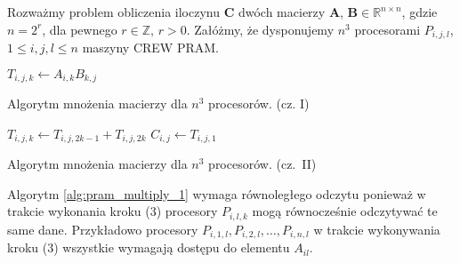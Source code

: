 
Rozważmy problem obliczenia iloczynu \(\mathbf{C}\) dwóch macierzy \(\mathbf{A}\), \(\mathbf{B}\in\mathbb{R}^{n\times n}\), gdzie \(n=2^r\), dla pewnego \(r\in\mathbb{Z},\, r>0\). Załóżmy, że dysponujemy \(n^3\) procesorami \(P_{i,j,l}\), \(1\leq i, j, l \leq n\) maszyny CREW PRAM. 

\begin{algorithm}[h]
\centering
\begin{algorithmic}[1]
\State \(T_{i,j,k} \gets A_{i,k}B_{k,j}\)
\EndParFor
{} 
\end{algorithmic}
\caption{Algorytm mnożenia macierzy dla \(n^3\) procesorów.\cite{Czech} (cz. I)}
\label{alg:pram_multiply_1}
\end{algorithm}

\begin{algorithm}[h]
\ContinuedFloat
\centering
\begin{algorithmic}[1]
	\State \(T_{i,j,k} \gets T_{i,j,2k-1}+T_{i,j,2k}\)
\EndParFor
\EndFor
{}
\State \(C_{i,j} \gets T_{i,j,1} \)
\EndParFor
\end{algorithmic}
\caption{Algorytm mnożenia macierzy dla \(n^3\) procesorów.\cite{Czech} (cz. II)}
\label{alg:pram_multiply_1}
\end{algorithm}

\begin{uwaga}
Algorytm \ref{alg:pram_multiply_1} wymaga równoległego odczytu ponieważ w trakcie wykonania kroku (3) procesory \(P_{i,l,k}\) mogą równocześnie odczytywać te same dane. Przykładowo procesory \(P_{i,1,l},P_{i,2,l},\dots,P_{i,n,l}\) w trakcie wykonywania kroku (3) wszystkie wymagają dostępu do elementu \(A_{il}\).
\end{uwaga}

